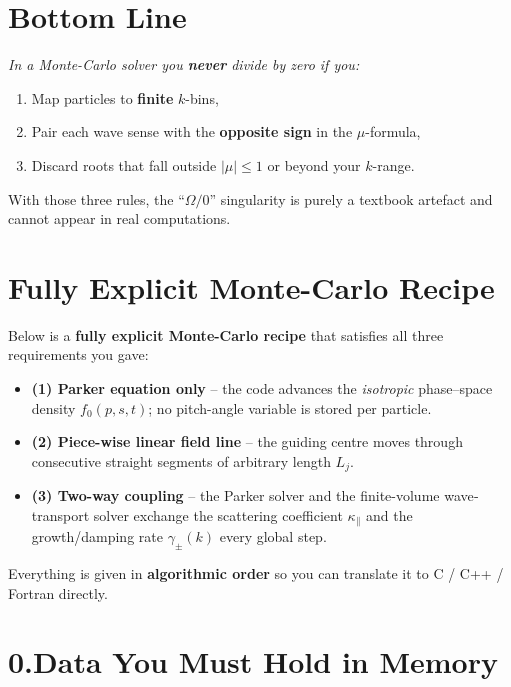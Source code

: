 \section*{Bottom Line}

\textit{In a Monte-Carlo solver you \textbf{never} divide by zero if you:}
\begin{enumerate}
\item Map particles to \textbf{finite} $k$-bins,
\item Pair each wave sense with the \textbf{opposite sign} in the $\mu$-formula,
\item Discard roots that fall outside $|\mu| \leq 1$ or beyond your $k$-range.
\end{enumerate}

With those three rules, the ``$\Omega/0$'' singularity is purely a textbook artefact and cannot appear in real computations.


\section*{Fully Explicit Monte-Carlo Recipe}

Below is a \textbf{fully explicit Monte-Carlo recipe} that satisfies all three requirements you gave:
\begin{itemize}
\item \textbf{(1) Parker equation only} – the code advances the \textit{isotropic} phase–space density $f_0(p,s,t)$; no pitch-angle variable is stored per particle.
\item \textbf{(2) Piece-wise linear field line} – the guiding centre moves through consecutive straight segments of arbitrary length $L_j$.
\item \textbf{(3) Two-way coupling} – the Parker solver and the finite-volume wave‐transport solver exchange the scattering coefficient $\kappa_\parallel$ and the growth/damping rate $\gamma_\pm(k)$ every global step.
\end{itemize}

Everything is given in \textbf{algorithmic order} so you can translate it to C / C++ / Fortran directly.

\section*{0.\quad Data You Must Hold in Memory}

